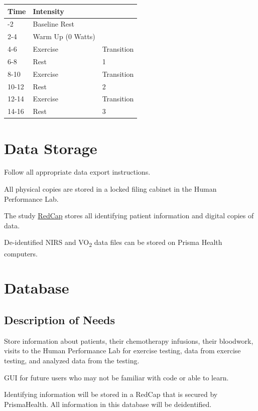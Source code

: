 \documentclass[
]{book}
\begin{document}
\begin{longtable}[]{@{}lll@{}}
\toprule\noalign{}
Time & Intensity & \\
\midrule\noalign{}
\endhead
\bottomrule\noalign{}
\endlastfoot
0-2 & Baseline Rest & \\
2-4 & Warm Up (0 Watts) & \\
4-6 & Exercise & Transition \\
6-8 & Rest & 1 \\
8-10 & Exercise & Transition \\
10-12 & Rest & 2 \\
12-14 & Exercise & Transition \\
14-16 & Rest & 3 \\
\end{longtable}

\hypertarget{DataStorage}{%
\chapter{Data Storage}\label{DataStorage}}

Follow all appropriate data export instructions.

All physical copies are stored in a locked filing cabinet in the Human Performance Lab.

The study \href{https://redcap.prismahealth.org}{RedCap} stores all identifying patient information and digital copies of data.

De-identified NIRS and VO\textsubscript{2} data files can be stored on Prisma Health computers.

\hypertarget{database}{%
\chapter{Database}\label{database}}

\hypertarget{description-of-needs}{%
\section{Description of Needs}\label{description-of-needs}}

Store information about patients, their chemotherapy infusions, their bloodwork, visits to the Human Performance Lab for exercise testing, data from exercise testing, and analyzed data from the testing.

GUI for future users who may not be familiar with code or able to learn.

Identifying information will be stored in a RedCap that is secured by PrismaHealth. All information in this database will be deidentified.
\end{document}
